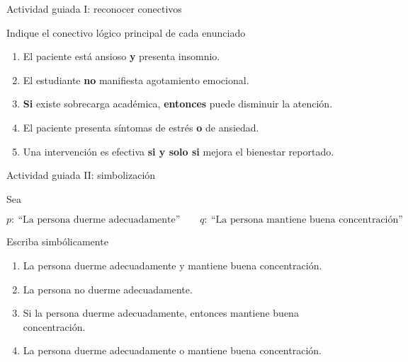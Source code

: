 \documentclass[aspectratio=169,10pt,handout]{beamer}
\newenvironment{IdeaClave}[1]
{
	\begin{block}{#1}
		\justifying
	}
	{
	\end{block}
}
\newenvironment{Ejemplo}[1]
{
	\begin{exampleblock}{#1}
		\justifying
	}
	{
	\end{exampleblock}
}
\begin{document}
	\begin{frame}{Actividad guiada I: reconocer conectivos}
		\begin{IdeaClave}{Indique el conectivo lógico principal de cada enunciado}
			\begin{enumerate}[leftmargin=*,label=\textbf{\arabic*.}]
				\item El paciente está ansioso \textbf{y} presenta insomnio.
				\item El estudiante \textbf{no} manifiesta agotamiento emocional.
				\item \textbf{Si} existe sobrecarga académica, \textbf{entonces} puede disminuir la atención.
				\item El paciente presenta síntomas de estrés \textbf{o} de ansiedad.
				\item Una intervención es efectiva \textbf{si y solo si} mejora el bienestar reportado.
			\end{enumerate}
		\end{IdeaClave}
	\end{frame}
	
	\begin{frame}{Actividad guiada II: simbolización}
		\begin{IdeaClave}{Sea}
			\[
			p:\ \text{``La persona duerme adecuadamente''}
			\qquad
			q:\ \text{``La persona mantiene buena concentración''}
			\]
		\end{IdeaClave}
		
		\begin{Ejemplo}{Escriba simbólicamente}
			\begin{enumerate}[leftmargin=*,label=\textbf{\alph*)}]
				\item La persona duerme adecuadamente y mantiene buena concentración.
				\item La persona no duerme adecuadamente.
				\item Si la persona duerme adecuadamente, entonces mantiene buena concentración.
				\item La persona duerme adecuadamente o mantiene buena concentración.
			\end{enumerate}
		\end{Ejemplo}
	\end{frame}
	
\end{document}
